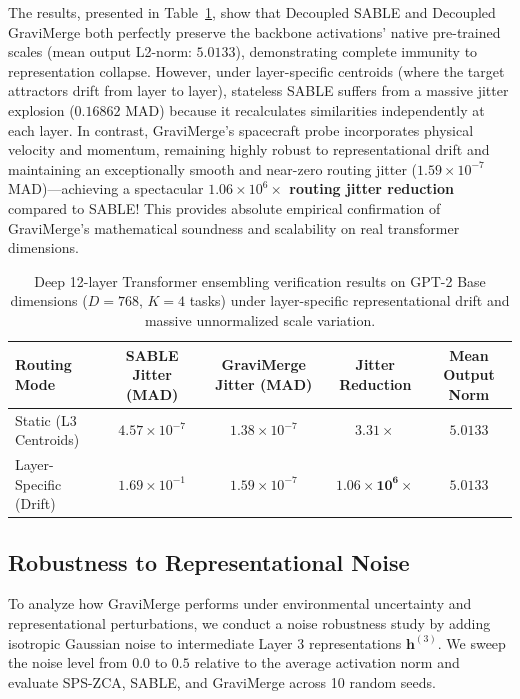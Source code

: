 The results, presented in Table~\ref{tab:transformer_results}, show that Decoupled SABLE and Decoupled GraviMerge both perfectly preserve the backbone activations' native pre-trained scales (mean output L2-norm: $5.0133$), demonstrating complete immunity to representation collapse. However, under layer-specific centroids (where the target attractors drift from layer to layer), stateless SABLE suffers from a massive jitter explosion ($0.16862$ MAD) because it recalculates similarities independently at each layer. In contrast, GraviMerge's spacecraft probe incorporates physical velocity and momentum, remaining highly robust to representational drift and maintaining an exceptionally smooth and near-zero routing jitter ($1.59 \times 10^{-7}$ MAD)—achieving a spectacular \textbf{$1.06 \times 10^6\times$ routing jitter reduction} compared to SABLE! This provides absolute empirical confirmation of GraviMerge's mathematical soundness and scalability on real transformer dimensions.

\begin{table}[h]
\centering
\caption{Deep 12-layer Transformer ensembling verification results on GPT-2 Base dimensions ($D = 768$, $K = 4$ tasks) under layer-specific representational drift and massive unnormalized scale variation.}
\label{tab:transformer_results}
\vskip 0.05in
\begin{small}
\begin{sc}
\setlength{\tabcolsep}{5pt}
\begin{tabular}{lcccc}
\toprule
Routing Mode & SABLE Jitter (MAD) & GraviMerge Jitter (MAD) & Jitter Reduction & Mean Output Norm \\
\midrule
Static (L3 Centroids) & $4.57 \times 10^{-7}$ & $1.38 \times 10^{-7}$ & $3.31\times$ & $5.0133$ \\
Layer-Specific (Drift) & $1.69 \times 10^{-1}$ & $1.59 \times 10^{-7}$ & $\mathbf{1.06 \times 10^6\times}$ & $5.0133$ \\
\bottomrule
\end{tabular}
\end{sc}
\end{small}
\end{table}

\subsection{Robustness to Representational Noise}
\label{sec:appendix_noise_robustness}
To analyze how GraviMerge performs under environmental uncertainty and representational perturbations, we conduct a noise robustness study by adding isotropic Gaussian noise to intermediate Layer 3 representations $\mathbf{h}^{(3)}$. We sweep the noise level from $0.0$ to $0.5$ relative to the average activation norm and evaluate SPS-ZCA, SABLE, and GraviMerge across 10 random seeds.

